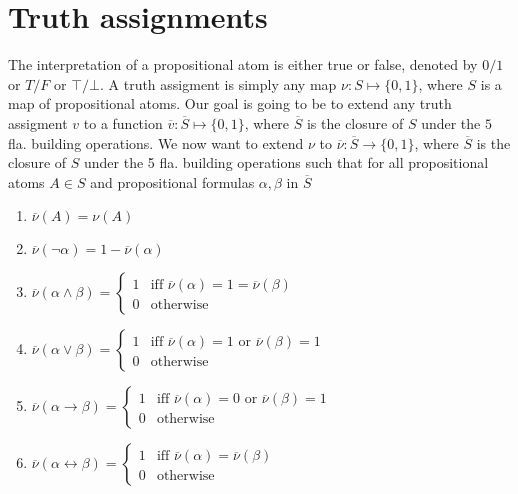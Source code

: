 \section{Truth assignments}
The interpretation of a propositional atom is either true or false, denoted by $0 / 1$ or $T / F$ or $\top / \bot$. 
A truth assigment is simply any map $\nu:S\mapsto \{0,1\}$, where $S$ is a map of propositional atoms. 
Our goal is going to be to extend any truth assigment $v$ to a function $\overline{v}: \overline{S}\mapsto \{0,1\}$, where $\overline{S}$ is the closure
of $S$ under the $5$ fla. building operations. 
We now want to extend $\nu$ to $\overline{\nu}: \overline{S}\to \{0,1\}$, where $\overline{S}$ is the closure of $S$ under the 5 fla. building operations such that
for all propositional atoms $A\in S$ and propositional formulas $\alpha,\beta$ in $\overline{S}$
\begin{enumerate}
    \item $\overline{\nu}(A) = \nu(A)$ 
    \item $\overline{\nu}(\lnot \alpha) = 1- \overline{\nu}(\alpha)$ 
    \item $\overline{\nu}(\alpha \land \beta) = \begin{cases}
        1 & \text{iff } \overline{\nu}(\alpha) = 1 = \overline{\nu}(\beta)\\
        0 & \text{otherwise}
    \end{cases}$
    \item $\overline{\nu}(\alpha \lor \beta) = \begin{cases}
        1 & \text{iff } \overline{\nu}(\alpha) = 1 \text{ or } \overline{\nu}(\beta) = 1\\
        0 & \text{otherwise}
    \end{cases}$
    \item $\overline{\nu}(\alpha \to \beta) = \begin{cases}
        1 & \text{iff } \overline{\nu}(\alpha) = 0 \text{ or } \overline{\nu}(\beta) = 1\\
        0 & \text{otherwise}
    \end{cases}$
    \item $\overline{\nu}(\alpha \leftrightarrow \beta) = \begin{cases}
        1 & \text{iff } \overline{\nu}(\alpha) =  \overline{\nu}(\beta)\\
        0 & \text{otherwise}
    \end{cases}$
\end{enumerate}

